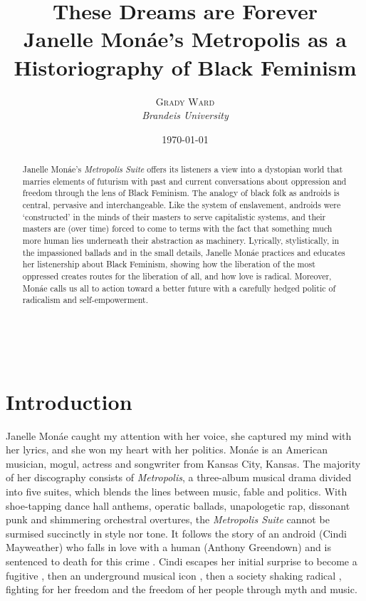 \documentclass[a4paper, 11pt]{article} %
\title{\linespread{2.1}\textbf{These Dreams are Forever}\\ %
Janelle Mon\'ae's Metropolis as a Historiography of Black Feminism} %
\author{\textsc{Grady Ward} %
\\{\textit{Brandeis University}}} %
\date{\today} %
\makeatletter
\renewcommand{\maketitle}{ %
\begin{flushright} %
	{\LARGE\@title} %

	\vspace{40pt} %

	{\large\@author} %
	\\\@date %

	\vspace{30pt} %
\end{flushright}
}
\makeatother
\begin{document}
\maketitle %


\begin{abstract}

Janelle Mon\'ae's \emph{Metropolis Suite} offers its listeners a view into a dystopian world that marries elements of futurism with past and current conversations about oppression and freedom through the lens of Black Feminism.
The analogy of black folk as androids is central, pervasive and interchangeable. 
Like the system of enslavement, androids were `constructed' in the minds of their masters to serve capitalistic systems, and their masters are (over time) forced to come to terms with the fact that something much more human lies underneath their abstraction as machinery.
Lyrically, stylistically, in the impassioned ballads and in the small details, Janelle Mon\'ae practices and educates her listenership about Black Feminism, showing how the liberation of the most oppressed creates routes for the liberation of all, and how love is radical.
Moreover, Mon\'ae calls us all to action toward a better future with a carefully hedged politic of radicalism and self-empowerment.

\end{abstract}

\vspace{30pt}


\section*{Introduction}

Janelle Mon\'ae caught my attention with her voice, she captured my mind with her lyrics, and she won my heart with her politics.
Mon\'ae is an American musician, mogul, actress and songwriter from Kansas City, Kansas.
The majority of her discography consists of \emph{Metropolis}, a three-album musical drama divided into five suites, which blends the lines between music, fable and politics.
With shoe-tapping dance hall anthems, operatic ballads, unapologetic rap, dissonant punk and shimmering orchestral overtures, the \emph{Metropolis Suite} cannot be surmised succinctly in style nor tone.
It follows the story of an android (Cindi Mayweather) who falls in love with a human (Anthony Greendown) and is sentenced to death for this crime \cite{wolfmasters}.
Cindi escapes her initial surprise to become a fugitive \cite{manymoons}, then an underground musical icon \cite{favoritefugitive}, then a society shaking radical \cite{fiveseveneighttwoone}, fighting for her freedom and the freedom of her people through myth and music.
\end{document}
